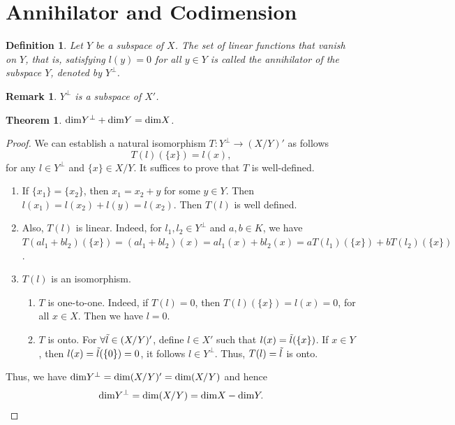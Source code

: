 \documentclass[11pt]{book}
\newtheorem{definition}{Definition}[chapter]
\newtheorem{theorem}{Theorem}[chapter]
\newtheorem{remark}{Remark}[chapter]
\theoremstyle{definition}
\numberwithin{equation}{chapter}
\begin{document}
\medskip

\section{Annihilator and Codimension}
\begin{definition}
Let $Y$ be a subspace of $X$. The set of linear functions that vanish on $Y$, that is, satisfying $l(y) = 0$ for all $y\in Y$ is called the annihilator of the subspace $Y$, denoted by $Y^\bot$.
\end{definition}
\begin{remark}
$Y^\bot$ is a subspace of $X'$.
\end{remark}

\medskip

\begin{theorem}
${\rm dim}Y^\bot + {\rm dim}Y = {\rm dim}X$.
\end{theorem}
\begin{proof}
We can establish a natural isomorphism $T:Y^\bot\to (X/Y)'$ as follows $$T(l)(\{x\}) = l(x),$$
for any $l\in Y^\bot$ and $\{x\}\in X/Y$. It suffices to prove that $T$ is well-defined.
\begin{enumerate}[label=(\alph*)]
    \item If $\{x_1\} = \{x_2\}$, then $x_1 = x_2 + y$ for some $y\in Y$. Then $l(x_1) = l(x_2) + l(y) = l(x_2)$. Then $T(l)$ is well defined.
    \item Also, $T(l)$ is linear. Indeed, for $l_1, l_2\in Y^\bot$ and $a,b \in K$, we have $T(al_1 + bl_2)(\{x\}) = (al_1 + bl_2)(x) = a l_1(x) + bl_2(x) = a T(l_1)(\{x\}) + b T(l_2)(\{x\})$.
    \item $T(l)$ is an isomorphism. 
    \begin{enumerate}[label=\arabic*)]
        \item $T$ is one-to-one. Indeed, if $T(l) = 0$, then $T(l)(\{x\}) = l(x) = 0$, for all $x\in X$. Then we have $l = 0$.
        \item $T$ is onto. For $\forall \Tilde{l}\in (X/Y)'$, define $l\in X'$ such that $l(x) = \Tilde{l}(\{x\})$. If $x\in Y$, then $l(x) = \Tilde{l}(\{0\}) = 0$, it follows $l\in Y^\bot$. Thus, $T(l) = \Tilde{l}$ is onto.
    \end{enumerate}
\end{enumerate}

Thus, we have ${\rm dim}Y^\bot = {\rm dim}(X/Y)' = {\rm dim}(X/Y)$ and hence 
\begin{align*}
    {\rm dim}Y^\bot = {\rm dim}(X/Y) = {\rm dim}X - {\rm dim}Y.
\end{align*}
\end{proof}
\end{document}
